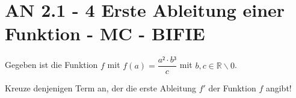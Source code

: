 \section{AN 2.1 - 4 Erste Ableitung einer Funktion - MC - BIFIE}

\begin{beispiel}[AN 2.1]{1} %
				Gegeben ist die Funktion $f$ mit $f(a)=\dfrac{a²\cdot b³}{c}$ mit $b,c\in\mathbb{R}\backslash0$.

Kreuze denjenigen Term an, der die erste Ableitung $f'$ der Funktion $f$ angibt!

\end{beispiel}